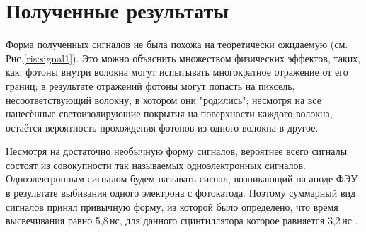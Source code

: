 \section{Полученные результаты}

\label{NeuRadres}


Форма полученных сигналов не была похожа на теоретически ожидаемую (см. Рис.\ref{ris:signal1}). Это можно объяснить множеством физических эффектов, таких, как: фотоны внутри волокна могут испытывать многократное отражение от его границ; в результате отражений фотоны могут попасть на пиксель, несоответствующий волокну, в котором они "родились"; несмотря на все нанесённые светоизолирующие покрытия на поверхности каждого волокна, остаётся вероятность прохождения фотонов из одного волокна в другое.


Несмотря на достаточно необычную форму сигналов, вероятнее всего сигналы состоят из совокупности так называемых одноэлектронных сигналов. Одноэлектронным сигналом будем называть сигнал, возникающий на аноде ФЭУ в результате выбивания одного электрона с фотокатода. Поэтому суммарный вид сигналов принял привычную форму, из которой было определено, что время высвечивания равно 5,8\,нс, для данного сцинтиллятора которое равняется 3,2\,нс \cite{crystals}.

